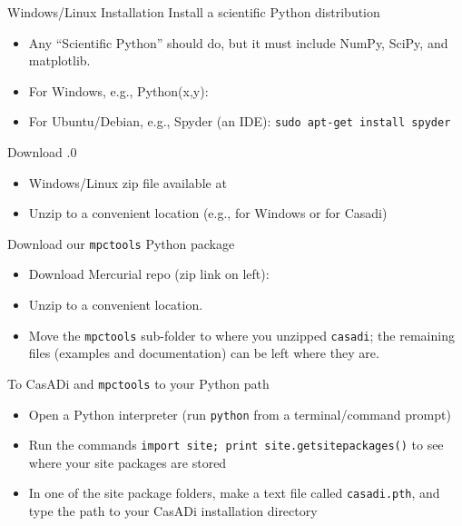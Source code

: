\documentclass[xcolor=dvipsnames]{beamer}
\begin{document}
%
\begin{frame}[allowframebreaks]{Windows/Linux Installation}
    Install a scientific Python distribution
    \begin{itemize}
        \item Any ``Scientific Python'' should do, but it must include NumPy, SciPy, and matplotlib.
        \item For Windows, e.g., Python(x,y): 
        \item For Ubuntu/Debian, e.g., Spyder (an IDE): \lstinline[style=shell]@sudo apt-get install spyder@
    \end{itemize}
    
    \medskip
    
    Download .0
    \begin{itemize}
        \item Windows/Linux zip file available at 
        \item Unzip to a convenient location (e.g.,  for Windows or  for Casadi)
    \end{itemize}
    
    \framebreak
    
    Download our \texttt{mpctools} Python package
    \begin{itemize}
        \item Download Mercurial repo (zip link on left): 
        \item Unzip to a convenient location.
        \item Move the \texttt{mpctools} sub-folder to where you unzipped \texttt{casadi}; the remaining files (examples and documentation) can be left where they are.
    \end{itemize}
    
    \medskip
    
    To CasADi and \texttt{mpctools} to your Python path
    \begin{itemize}
        \item Open a Python interpreter (run \lstinline[style=shell]!python! from a terminal/command prompt)
        \item Run the commands \lstinline[style=python]!import site; print site.getsitepackages()! to see where your site packages are stored
        \item In one of the site package folders, make a text file called \texttt{casadi.pth}, and type the path to your CasADi installation directory
    \end{itemize}
\end{frame}
\end{document}

